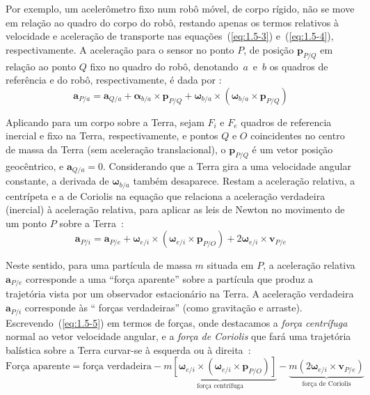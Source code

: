 Por exemplo, um acelerômetro fixo num robô móvel, de corpo rígido, não se move em relação ao quadro do corpo do robô, restando apenas os termos relativos à velocidade e aceleração de transporte nas equações~(\ref{eq:1.5-3}) e~(\ref{eq:1.5-4}), respectivamente. A aceleração para o sensor no ponto \(P\), de posição \(\mathbf{p}_{P/Q}\) em relação ao ponto \(Q\) fixo no quadro do robô, denotando~\(a\)~e~\(b\) os quadros de referência e do robô, respectivamente, é dada por \cite{Stevens2016}:
\begin{equation*}
    {\mathbf{a}_{P/a}} = {\mathbf{a}_{Q/a}} + {\mathbf{\alpha}_{b/a}}\!\times\!{\mathbf{p}_{P/Q}} + {\mathbf{\omega}_{b/a}}\!\times\!\left({\mathbf{\omega}_{b/a}}\!\times\!{\mathbf{p}_{P/Q}}\right)
\end{equation*}

Aplicando para um corpo sobre a Terra, sejam \(F_{i}\)  e  \(F_{e}\) quadros de referencia inercial e fixo na Terra, respectivamente, e pontos \(Q\) e \(O\) coincidentes no centro de massa da Terra (sem aceleração translacional), o \(\mathbf{p}_{P/Q}\) é um vetor posição geocêntrico, e \(\mathbf{a}_{Q/a}=0\). Considerando que a Terra gira a uma velocidade angular constante, a derivada de \(\mathbf{\omega}_{b/a}\) também desaparece. Restam a aceleração relativa, a centrípeta e a de Coriolis na equação que relaciona a aceleração verdadeira (inercial) à aceleração relativa, para aplicar as leis de Newton no movimento de um ponto \(P\) sobre a Terra~\cite{Stevens2016}:
\begin{equation} \label{eq:1.5-5}
    {\mathbf{a}_{P/i}} = {\mathbf{a}_{P/e}} + {\mathbf{\omega}_{e/i}}\!\times\!\left({\mathbf{\omega}_{e/i}}\!\times\!{\mathbf{p}_{P/O}}\right) + 2\mathbf{\omega}_{e/i}\!\times\!\mathbf{v}_{P/e}
\end{equation}

Neste sentido, para uma partícula de massa \(m\) situada em \(P\), a aceleração relativa \(\mathbf{a}_{P/e}\) corresponde a uma ``força aparente'' sobre a partícula que produz a trajetória vista por um observador estacionário na Terra. A aceleração verdadeira \(\mathbf{a}_{P/i}\) corresponde às `` forças verdadeiras'' (como gravitação e arraste).  Escrevendo~(\ref{eq:1.5-5}) em termos de forças, onde destacamos a \textit{força centrífuga} normal ao vetor velocidade angular, e a \textit{força de Coriolis}\footnotemark{} que fará uma trajetória balística sobre a Terra curvar-se à esquerda ou à direita~\cite{Stevens2016}:
\begin{equation*}
    \text{Força aparente} = \text{força verdadeira} - \underbrace{m \left[{\mathbf{\omega}_{e/i}}\!\times\!\left({\mathbf{\omega}_{e/i}}\!\times\!{\mathbf{p}_{P/O}}\right)\right]}_{\text{força centrífuga}} - \underbrace{m \left( 2{\mathbf{\omega}_{e/i}}\!\times\!{\mathbf{v}_{P/e}}\right)}_{\text{força de Coriolis}}
\end{equation*}

